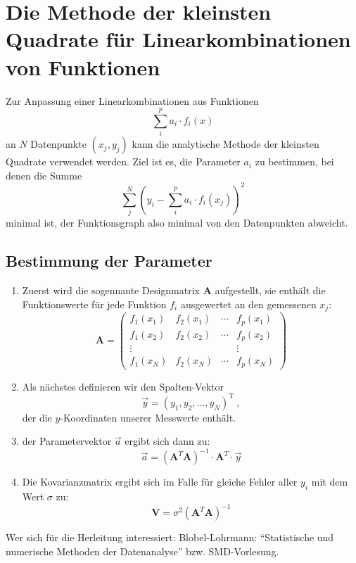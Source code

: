 \documentclass{scrartcl}
\begin{document}
\section*{Die Methode der kleinsten Quadrate für Linearkombinationen von Funktionen}

Zur Anpassung einer Linearkombinationen aus Funktionen 
\begin{equation}
    \sum_i^p a_i \cdot f_i(x)
\end{equation}
an $N$ Datenpunkte $(x_j, y_j)$ kann die analytische Methode der kleinsten Quadrate verwendet werden. 
Ziel ist es, die Parameter $a_i$ zu bestimmen, bei denen die Summe
\begin{equation}
    \sum_j^N\left( y_i - \sum_i^p a_i\cdot f_i(x_j)\right)^2
\end{equation}
minimal ist, der Funktionsgraph also minimal von den Datenpunkten abweicht.
\subsection*{Bestimmung der Parameter}

\begin{enumerate}
    \item Zuerst wird die sogennante Designmatrix $\mathbf{A}$ aufgestellt, sie enthält die Funktionswerte für jede Funktion $f_i$ ausgewertet an den gemessenen $x_j$:
        \begin{equation}
            \mathbf{A} = 
            \begin{pmatrix}
                f_1(x_1) & f_2(x_1) & \cdots & f_p(x_1) \\  
                f_1(x_2) & f_2(x_2) & \cdots & f_p(x_2) \\  
                \vdots   &          &        &  \vdots  \\
                f_1(x_N) & f_2(x_N) & \cdots & f_p(x_N) 
            \end{pmatrix}
        \end{equation}
    \item Als nächstes definieren wir den Spalten-Vektor 
        \begin{equation}
            \vec{y} = (y_1, y_2, …, y_N)^\mathrm{T} \ ,
        \end{equation}
        der die $y$-Koordinaten unserer Messwerte enthält.
    \item der Parametervektor $\vec{a}$ ergibt sich dann zu:
        \begin{equation}
            \vec{a} = \left(\mathbf{A}^T \mathbf{A}\right)^{-1} \cdot \mathbf{A}^T \cdot \vec{y}
        \end{equation}

    \item Die Kovarianzmatrix ergibt sich im Falle für gleiche Fehler aller $y_i$ mit dem Wert $\sigma$ zu:
        \begin{equation}
            \mathbf{V} = \sigma^2 \left(\mathbf{A}^T \mathbf{A}\right)^{-1}
        \end{equation}
\end{enumerate}
Wer sich für die Herleitung interessiert: Blobel-Lohrmann: \enquote{Statistische und numerische Methoden der Datenanalyse} bzw. SMD-Vorlesung.
\end{document}
